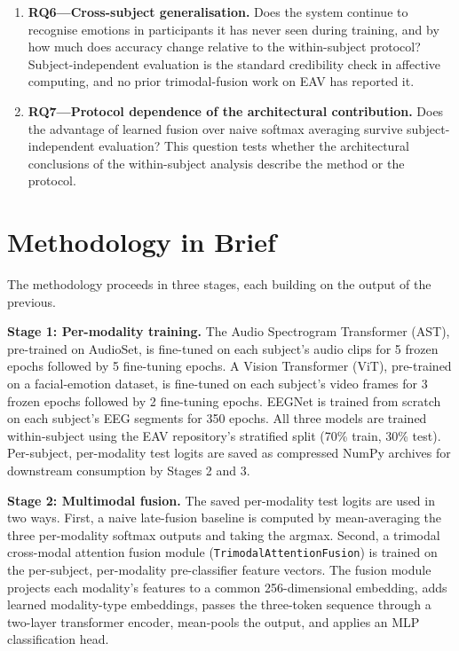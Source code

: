 \begin{enumerate}
    \item \textbf{RQ6---Cross-subject generalisation.} Does the system continue to
    recognise emotions in participants it has never seen during training, and by how
    much does accuracy change relative to the within-subject protocol? Subject-independent
    evaluation is the standard credibility check in affective computing, and no prior
    trimodal-fusion work on EAV has reported it.
    \item \textbf{RQ7---Protocol dependence of the architectural contribution.} Does
    the advantage of learned fusion over naive softmax averaging survive
    subject-independent evaluation? This question tests whether the architectural
    conclusions of the within-subject analysis describe the method or the protocol.
\end{enumerate}

\section{Methodology in Brief}
The methodology proceeds in three stages, each building on the output of the previous.

\textbf{Stage 1: Per-modality training.} The Audio Spectrogram Transformer (AST), pre-trained on AudioSet, is fine-tuned on each subject's audio clips for 5 frozen epochs followed by 5 fine-tuning epochs. A Vision Transformer (ViT), pre-trained on a facial-emotion dataset, is fine-tuned on each subject's video frames for 3 frozen epochs followed by 2 fine-tuning epochs. EEGNet is trained from scratch on each subject's EEG segments for 350 epochs. All three models are trained within-subject using the EAV repository's stratified split (70\% train, 30\% test). Per-subject, per-modality test logits are saved as compressed NumPy archives for downstream consumption by Stages 2 and 3.

\textbf{Stage 2: Multimodal fusion.} The saved per-modality test logits are used in two ways. First, a naive late-fusion baseline is computed by mean-averaging the three per-modality softmax outputs and taking the argmax. Second, a trimodal cross-modal attention fusion module (\texttt{TrimodalAttentionFusion}) is trained on the per-subject, per-modality pre-classifier feature vectors. The fusion module projects each modality's features to a common 256-dimensional embedding, adds learned modality-type embeddings, passes the three-token sequence through a two-layer transformer encoder, mean-pools the output, and applies an MLP classification head.

